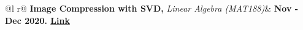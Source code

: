 \begin{tabularx}{\linewidth}{ @{}l r@{} }
\textbf{Image Compression with SVD,} \textit{Linear Algebra (MAT188)}& \hfill \textbf{Nov - Dec 2020. \href{https://www.github.com/destefy/portfolio}{Link}} \\[3.75pt]
 \\
\end{tabularx}
\\[8pt]